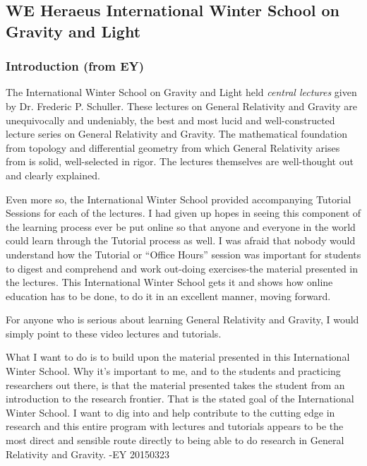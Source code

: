 \documentclass[10pt, twoside]{amsart}
\begin{document}

\tableofcontents

\begin{multicols*}{2}



\part{WE Heraeus International Winter School on Gravity and Light}

\section*{Introduction (from EY)}

The International Winter School on Gravity and Light held \emph{central lectures} given by Dr. Frederic P. Schuller. These lectures on General Relativity and Gravity are unequivocally and undeniably, the best and most lucid and well-constructed lecture series on General Relativity and Gravity.  The mathematical foundation from topology and differential geometry from which General Relativity arises from is solid, well-selected in rigor.  The lectures themselves are well-thought out and clearly explained.  

Even more so, the International Winter School provided accompanying Tutorial Sessions for each of the lectures.  I had given up hopes in seeing this component of the learning process ever be put online so that anyone and everyone in the world could learn through the Tutorial process as well.  I was afraid that nobody would understand how the Tutorial or ``Office Hours'' session was important for students to digest and comprehend and work out-doing exercises-the material presented in the lectures.  This International Winter School gets it and shows how online education has to be done, to do it in an excellent manner, moving forward.  

For anyone who is serious about learning General Relativity and Gravity, I would simply point to these video lectures and tutorials.  

What I want to do is to build upon the material presented in this International Winter School.  Why it's important to me, and to the students and practicing researchers out there, is that the material presented takes the student from an introduction to the research frontier.  That is the stated goal of the International Winter School.  I want to dig into and help contribute to the cutting edge in research and this entire program with lectures and tutorials appears to be the most direct and sensible route directly to being able to do research in General Relativity and Gravity. -EY 20150323



\end{multicols*}
\end{document}
